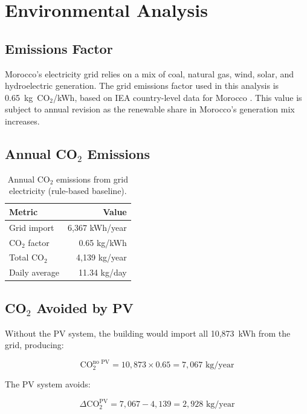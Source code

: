 \chapter{Environmental Analysis}
\label{ch:environmental}

\section{Emissions Factor}

Morocco's electricity grid relies on a mix of coal, natural gas, wind, solar, and hydroelectric generation. The grid emissions factor used in this analysis is 0.65~kg~CO$_2$/kWh, based on IEA country-level data for Morocco \cite{iea2024}. This value is subject to annual revision as the renewable share in Morocco's generation mix increases.

\section{Annual CO$_2$ Emissions}

\begin{table}[H]
\centering
\caption{Annual CO$_2$ emissions from grid electricity (rule-based baseline).}
\begin{tabular}{lr}
\toprule
\textbf{Metric} & \textbf{Value} \\
\midrule
Grid import & 6,367 kWh/year \\
CO$_2$ factor & 0.65 kg/kWh \\
Total CO$_2$ & 4,139 kg/year \\
Daily average & 11.34 kg/day \\
\bottomrule
\end{tabular}
\end{table}

\section{CO$_2$ Avoided by PV}

Without the PV system, the building would import all 10,873~kWh from the grid, producing:

\begin{equation}
    \text{CO}_2^{\text{no PV}} = 10{,}873 \times 0.65 = 7{,}067 \text{ kg/year}
\end{equation}

The PV system avoids:

\begin{equation}
    \Delta\text{CO}_2^{\text{PV}} = 7{,}067 - 4{,}139 = 2{,}928 \text{ kg/year}
\end{equation}

